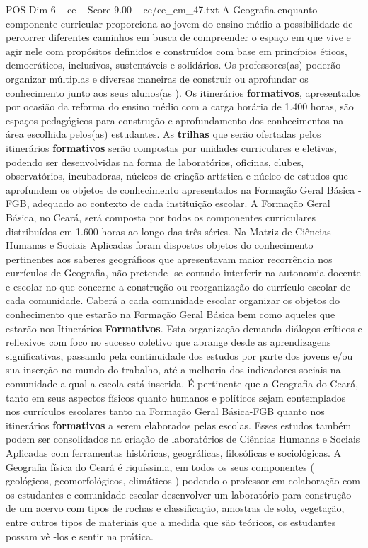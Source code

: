 \begin{textsample}{POS Dim 6 – ce – Score 9.00 – ce/ce\_em\_47.txt}
A Geografia enquanto componente curricular proporciona ao jovem do ensino médio a possibilidade de percorrer diferentes caminhos em busca de compreender o espaço em que vive e agir nele com propósitos definidos e construídos com base em princípios éticos, democráticos, inclusivos, sustentáveis e solidários.
Os professores(as) poderão organizar múltiplas e diversas maneiras de construir ou aprofundar os conhecimento junto aos seus alunos(as ).
Os itinerários \textbf{formativos}, apresentados por ocasião da reforma do ensino médio com a carga horária de 1.400 horas, são espaços pedagógicos para construção e aprofundamento dos conhecimentos na área escolhida pelos(as) estudantes.
As \textbf{trilhas} que serão ofertadas pelos itinerários \textbf{formativos} serão compostas por unidades curriculares e eletivas, podendo ser desenvolvidas na forma de laboratórios, oficinas, clubes, observatórios, incubadoras, núcleos de criação artística e núcleo de estudos que aprofundem os objetos de conhecimento apresentados na Formação Geral Básica - FGB, adequado ao contexto de cada instituição escolar.
A Formação Geral Básica, no Ceará, será composta por todos os componentes curriculares distribuídos em 1.600 horas ao longo das três séries.
Na Matriz de Ciências Humanas e Sociais Aplicadas foram dispostos objetos do conhecimento pertinentes aos saberes geográficos que apresentavam maior recorrência nos currículos de Geografia, não pretende -se contudo interferir na autonomia docente e escolar no que concerne a construção ou reorganização do currículo escolar de cada comunidade.
Caberá a cada comunidade escolar organizar os objetos do conhecimento que estarão na Formação Geral Básica bem como aqueles que estarão nos Itinerários \textbf{Formativos}.
Esta organização demanda diálogos críticos e reflexivos com foco no sucesso coletivo que abrange desde as aprendizagens significativas, passando pela continuidade dos estudos por parte dos jovens e/ou sua inserção no mundo do trabalho, até a melhoria dos indicadores sociais na comunidade a qual a escola está inserida.
É pertinente que a Geografia do Ceará, tanto em seus aspectos físicos quanto humanos e políticos sejam contemplados nos currículos escolares tanto na Formação Geral Básica-FGB quanto nos itinerários \textbf{formativos} a serem elaborados pelas escolas.
Esses estudos também podem ser consolidados na criação de laboratórios de Ciências Humanas e Sociais Aplicadas com ferramentas históricas, geográficas, filosóficas e sociológicas.
A Geografia física do Ceará é riquíssima, em todos os seus componentes ( geológicos, geomorfológicos, climáticos ) podendo o professor em colaboração com os estudantes e comunidade escolar desenvolver um laboratório para construção de um acervo com tipos de rochas e classificação, amostras de solo, vegetação, entre outros tipos de materiais que a medida que são teóricos, os estudantes possam vê -los e sentir na prática.

\end{textsample}
